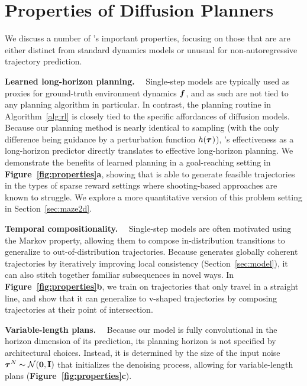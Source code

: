 \section{Properties of Diffusion Planners}
\label{sec:properties}

We discuss a number of \method's important properties, focusing on those that are are either distinct from standard dynamics models or unusual for non-autoregressive trajectory prediction.


\textbf{Learned long-horizon planning.}~~
Single-step models are typically used as proxies for ground-truth environment dynamics ${\bm{f}}$, and as such are not tied to any planning algorithm in particular.
In contrast, the planning routine in Algorithm~\ref{alg:rl} is closely tied to the specific affordances of diffusion models.
Because our planning method is nearly identical to sampling (with the only difference being guidance by a perturbation function $h(\bm{\tau}^{})$), \method's effectiveness as a long-horizon predictor directly translates to effective long-horizon planning.
We demonstrate the benefits of learned planning in a goal-reaching setting in \textbf{Figure~\ref{fig:properties}a}, showing that \method is able to generate feasible trajectories in the types of sparse reward settings where shooting-based approaches are known to struggle.
We explore a more quantitative version of this problem setting in Section~\ref{sec:maze2d}.

\vspace{.2em}
\textbf{Temporal compositionality.}~~
Single-step models are often motivated using the Markov property, allowing them to compose in-distribution transitions to generalize to out-of-distribution trajectories.
Because \method generates globally coherent trajectories by iteratively improving local consistency (Section~\ref{sec:model}), it can also stitch together familiar subsequences in novel ways.
In \textbf{Figure~\ref{fig:properties}b}, we train \method on trajectories that only travel in a straight line, and show that it can generalize to v-shaped trajectories by composing trajectories at their point of intersection.

\vspace{.2em}
\textbf{Variable-length plans.}~~
Because our model is fully convolutional in the horizon dimension of its prediction, its planning horizon is not specified by architectural choices.
Instead, it is determined by the size of the input noise $\bm{\tau}^{N} \sim \mathcal{N(\mathbf{0}, \mathbf{I})}$ that initializes the denoising process, allowing for variable-length plans (\textbf{Figure~\ref{fig:properties}c}).

